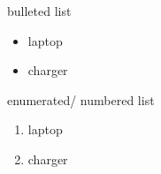 \documentclass{article}  %
\begin{document}
 
{\large bulleted list}
\begin{itemize}  
\item laptop  
\item charger  
\end{itemize}  

\vspace{3cm} 
 
{\large enumerated/ numbered list}
\begin{enumerate}  
\item laptop  
\item \hspace{2cm} charger  
\end{enumerate}  
\end{document}

